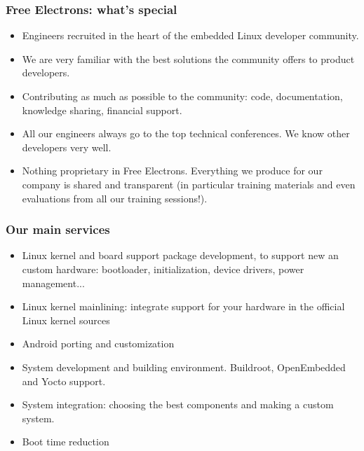 \begin{frame}
\frametitle{Free Electrons: what's special}
  \begin{itemize}
    \item Engineers recruited in the heart of the embedded Linux
   	  developer community.
    \item We are very familiar with the best solutions the
          community offers to product developers.
    \item Contributing as much as possible to the community:
          code, documentation, knowledge sharing, financial support.
    \item All our engineers always go to the top technical
          conferences. We know other developers very well.
    \item Nothing proprietary in Free Electrons. Everything we
          produce for our company is shared and transparent
          (in particular training materials and even evaluations
          from all our training sessions!).
  \end{itemize}
\end{frame}

\begin{frame}
\frametitle{Our main services}
  \begin{itemize}
     \item Linux kernel and board support package development,
    	   to support new an custom hardware:
           bootloader, initialization, device drivers, power
           management...
     \item Linux kernel mainlining: integrate support for your
           hardware in the official Linux kernel sources 
     \item Android porting and customization
     \item System development and building environment.
           Buildroot, OpenEmbedded and Yocto support.
     \item System integration: choosing the best components
           and making a custom system. 
     \item Boot time reduction
  \end{itemize}
\end{frame}

